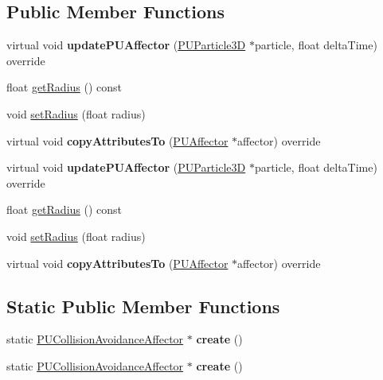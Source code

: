 \subsection*{Public Member Functions}
\begin{DoxyCompactItemize}
\item 
\mbox{\label{classPUCollisionAvoidanceAffector_a408b51077d83f9da9313ab06b2b449ac}} 
virtual void {\bfseries update\+P\+U\+Affector} (\hyperlink{structPUParticle3D}{P\+U\+Particle3D} $\ast$particle, float delta\+Time) override
\item 
float \hyperlink{classPUCollisionAvoidanceAffector_a29581c500069ea205d3621ff8d11c920}{get\+Radius} () const
\item 
void \hyperlink{classPUCollisionAvoidanceAffector_a4124da679ca1496427d6b44a4bff6f5a}{set\+Radius} (float radius)
\item 
\mbox{\label{classPUCollisionAvoidanceAffector_aa66b742b7250fb94ccd4b4eaaa468a12}} 
virtual void {\bfseries copy\+Attributes\+To} (\hyperlink{classPUAffector}{P\+U\+Affector} $\ast$affector) override
\item 
\mbox{\label{classPUCollisionAvoidanceAffector_a2af29689121c2466696a5397904394ea}} 
virtual void {\bfseries update\+P\+U\+Affector} (\hyperlink{structPUParticle3D}{P\+U\+Particle3D} $\ast$particle, float delta\+Time) override
\item 
float \hyperlink{classPUCollisionAvoidanceAffector_a29581c500069ea205d3621ff8d11c920}{get\+Radius} () const
\item 
void \hyperlink{classPUCollisionAvoidanceAffector_a4124da679ca1496427d6b44a4bff6f5a}{set\+Radius} (float radius)
\item 
\mbox{\label{classPUCollisionAvoidanceAffector_a88d73989870ce85de0106afc7d1b44b1}} 
virtual void {\bfseries copy\+Attributes\+To} (\hyperlink{classPUAffector}{P\+U\+Affector} $\ast$affector) override
\end{DoxyCompactItemize}
\subsection*{Static Public Member Functions}
\begin{DoxyCompactItemize}
\item 
\mbox{\label{classPUCollisionAvoidanceAffector_a0112ade65b88dc6bbb2f1c46240baee6}} 
static \hyperlink{classPUCollisionAvoidanceAffector}{P\+U\+Collision\+Avoidance\+Affector} $\ast$ {\bfseries create} ()
\item 
\mbox{\label{classPUCollisionAvoidanceAffector_aaf5d6c6fc969b696a941fd86e0a4d218}} 
static \hyperlink{classPUCollisionAvoidanceAffector}{P\+U\+Collision\+Avoidance\+Affector} $\ast$ {\bfseries create} ()
\end{DoxyCompactItemize}
